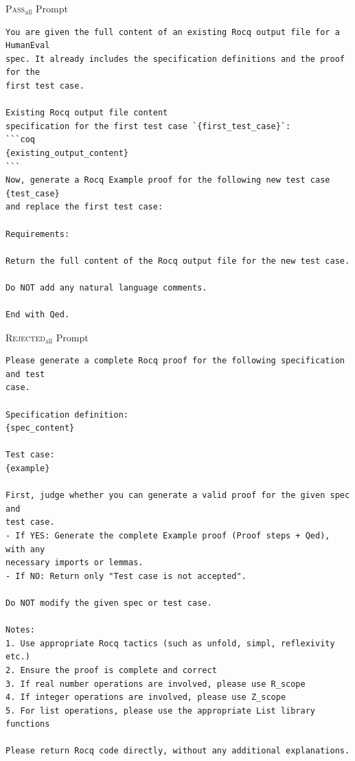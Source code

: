 \begin{promptbox}{\textsc{Pass}$_{\text{all}}$ Prompt}
\begin{verbatim}
You are given the full content of an existing Rocq output file for a HumanEval 
spec. It already includes the specification definitions and the proof for the 
first test case.

Existing Rocq output file content
specification for the first test case `{first_test_case}`:
```coq
{existing_output_content}
```
Now, generate a Rocq Example proof for the following new test case {test_case} 
and replace the first test case:

Requirements:

Return the full content of the Rocq output file for the new test case.

Do NOT add any natural language comments.

End with Qed.
\end{verbatim}
\end{promptbox}

\clearpage
\begin{promptbox}{\textsc{Rejected}$_{\text{all}}$ Prompt}
\begin{verbatim}
Please generate a complete Rocq proof for the following specification and test
case.

Specification definition:
{spec_content}

Test case:
{example}

First, judge whether you can generate a valid proof for the given spec and 
test case.
- If YES: Generate the complete Example proof (Proof steps + Qed), with any 
necessary imports or lemmas.
- If NO: Return only "Test case is not accepted".

Do NOT modify the given spec or test case.

Notes:
1. Use appropriate Rocq tactics (such as unfold, simpl, reflexivity etc.)
2. Ensure the proof is complete and correct
3. If real number operations are involved, please use R_scope
4. If integer operations are involved, please use Z_scope
5. For list operations, please use the appropriate List library functions

Please return Rocq code directly, without any additional explanations.
\end{verbatim}
\end{promptbox}


